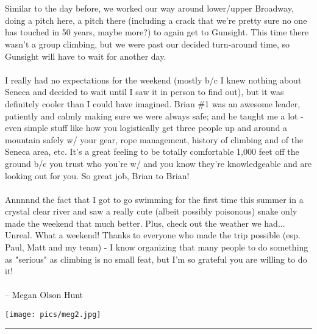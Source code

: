 \documentclass[10pt,a4paper]{article}
\newenvironment{Figure}
  {\par\medskip\noindent\minipage{\linewidth}}
  {\endminipage\par\medskip}
\begin{document}
\begin{multicols}{2}
\\
\\
Similar to the day before, we worked our way around lower/upper Broadway, doing a pitch here, a pitch there (including a crack that we're pretty sure no one has touched in 50 years, maybe more?) to again get to Gunsight. This time there wasn't a group climbing, but we were past our decided turn-around time, so Gunsight will have to wait for another day.
\\
\\
I really had no expectations for the weekend (mostly b/c I knew nothing about Seneca and decided to wait until I saw it in person to find out), but it was definitely cooler than I could have imagined. Brian \#1 was an awesome leader, patiently and calmly making sure we were always safe; and he taught me a lot - even simple stuff like how you logistically get three people up and around a mountain safely w/ your gear, rope management, history of climbing and of the Seneca area, etc. It's a great feeling to be totally comfortable 1,000 feet off the ground b/c you trust who you're w/ and you know they're knowledgeable and are looking out for you. So great job, Brian to Brian!
\\
\\
Annnnnd the fact that I got to go swimming for the first time this summer in a crystal clear river and saw a really cute (albeit possibly poisonous) snake only made the weekend that much better. Plus, check out the weather we had... Unreal. What a weekend! Thanks to everyone who made the trip possible (esp. Paul, Matt and my team) - I know organizing that many people to do something as "serious" as climbing is no small feat, but I'm so grateful you are willing to do it!
\\
\\
-- Megan Olson Hunt
\begin{Figure}
 \centering
 \texttt{[image: pics/meg2.jpg]}
\end{Figure}


\hrule


\end{multicols}
\end{document}

